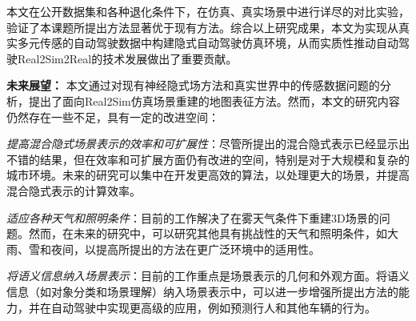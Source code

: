 \begin{conclusion}
本文在公开数据集和各种退化条件下，在仿真、真实场景中进行详尽的对比实验，验证了本课题所提出方法显著优于现有方法。综合以上研究成果，本文为实现从真实多元传感的自动驾驶数据中构建隐式自动驾驶仿真环境，从而实质性推动自动驾驶Real2Sim2Real的技术发展做出了重要贡献。

\clearpage
\textbf{未来展望：}
本文通过对现有神经隐式场方法和真实世界中的传感数据问题的分析，提出了面向Real2Sim仿真场景重建的地图表征方法。然而，本文的研究内容仍然存在一些不足，具有一定的改进空间：

\textit{提高混合隐式场景表示的效率和可扩展性}：尽管所提出的混合隐式表示已经显示出不错的结果，但在效率和可扩展方面仍有改进的空间，特别是对于大规模和复杂的城市环境。未来的研究可以集中在开发更高效的算法，以处理更大的场景，并提高混合隐式表示的计算效率。

\textit{适应各种天气和照明条件}：目前的工作解决了在雾天气条件下重建3D场景的问题。然而，在未来的研究中，可以研究其他具有挑战性的天气和照明条件，如大雨、雪和夜间，以提高所提出的方法在更广泛环境中的适用性。

\textit{将语义信息纳入场景表示}：目前的工作重点是场景表示的几何和外观方面。将语义信息（如对象分类和场景理解）纳入场景表示中，可以进一步增强所提出方法的能力，并在自动驾驶中实现更高级的应用，例如预测行人和其他车辆的行为。




\end{conclusion}

